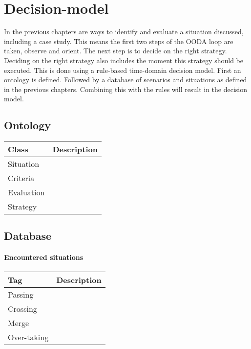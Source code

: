 \chapter{Decision-model}
In the previous chapters are ways to identify and evaluate a situation discussed, including a case study. This means the first two steps of the OODA loop are taken, observe and orient. The next step is to decide on the right strategy. Deciding on the right strategy also includes the moment this strategy should be executed. 
This is done using a rule-based time-domain decision model. First an ontology is defined. Followed by a database of scenarios and situations as defined in the previous chapters. Combining this with the rules will result in the decision model. 

\section{Ontology}
\begin{table}[h]
	\begin{tabular}{p{}|p{}}
		\toprule
		Class & Description\\
		\midrule
		Situation & \\
		Criteria & \\
		Evaluation & \\
		Strategy & \\
		\bottomrule
	\end{tabular}
	
	\label{tab:situations}
\end{table}

\section{Database}

\subsubsection{Encountered situations}
\begin{table}[h]
	\begin{tabular}{p{}|p{}}
		\toprule
		Tag & Description\\
		\midrule
		Passing & \\
		Crossing & \\
		Merge & \\
		Over-taking & \\
		\bottomrule
	\end{tabular}
	
	\label{tab:situations}
\end{table}

